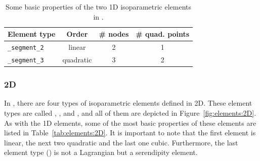 \begin{table}[!htb]
\begin{center}
\begin{tabular}{l|ccc}
\toprule
Element type & Order & \# nodes & \# quad. points \\
\midrule
\texttt{\_segment\_2} & linear & 2 & 1 \\
\texttt{\_segment\_3} & quadratic & 3 & 2 \\
\bottomrule
\end{tabular}
\end{center}
\caption{Some basic properties of the two 1D isoparametric elements in \akantu.}
\label{tab:elements:1D}
\end{table}

\subsubsection*{2D}

In \akantu, there are four types of isoparametric elements defined in 2D. These
element types are called , ,
 and , and all of them are depicted
in Figure~\ref{fig:elements:2D}. As with the 1D elements, some of the most basic
properties of these elements are listed in Table~\ref{tab:elements:2D}. It is
important to note that the first element is linear, the next two quadratic and
the last one cubic. Furthermore, the last element type ()
is not a Lagrangian but a serendipity element.

